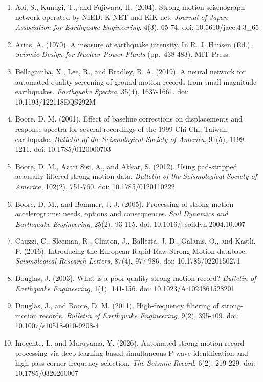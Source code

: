 \documentclass[UTF8,a4paper,zihao=5]{ctexart}
\begin{document}
\begin{enumerate}
\def\labelenumi{\arabic{enumi}.}
\item
  Aoi, S., Kunugi, T., and Fujiwara, H. (2004). Strong-motion seismograph network operated by NIED: K-NET and KiK-net. \emph{Journal of Japan Association for Earthquake Engineering}, 4(3), 65-74. doi: 10.5610/jaee.4.3\_65
\item
  Arias, A. (1970). A measure of earthquake intensity. In R. J. Hansen (Ed.), \emph{Seismic Design for Nuclear Power Plants} (pp.~438-483). MIT Press.
\item
  Bellagamba, X., Lee, R., and Bradley, B. A. (2019). A neural network for automated quality screening of ground motion records from small magnitude earthquakes. \emph{Earthquake Spectra}, 35(4), 1637-1661. doi: 10.1193/122118EQS292M
\item
  Boore, D. M. (2001). Effect of baseline corrections on displacements and response spectra for several recordings of the 1999 Chi-Chi, Taiwan, earthquake. \emph{Bulletin of the Seismological Society of America}, 91(5), 1199-1211. doi: 10.1785/0120000703
\item
  Boore, D. M., Azari Sisi, A., and Akkar, S. (2012). Using pad-stripped acausally filtered strong-motion data. \emph{Bulletin of the Seismological Society of America}, 102(2), 751-760. doi: 10.1785/0120110222
\item
  Boore, D. M., and Bommer, J. J. (2005). Processing of strong-motion accelerograms: needs, options and consequences. \emph{Soil Dynamics and Earthquake Engineering}, 25(2), 93-115. doi: 10.1016/j.soildyn.2004.10.007
\item
  Cauzzi, C., Sleeman, R., Clinton, J., Ballesta, J. D., Galanis, O., and Kastli, P. (2016). Introducing the European Rapid Raw Strong-Motion database. \emph{Seismological Research Letters}, 87(4), 977-986. doi: 10.1785/0220150271
\item
  Douglas, J. (2003). What is a poor quality strong-motion record? \emph{Bulletin of Earthquake Engineering}, 1(1), 141-156. doi: 10.1023/A:1024861528201
\item
  Douglas, J., and Boore, D. M. (2011). High-frequency filtering of strong-motion records. \emph{Bulletin of Earthquake Engineering}, 9(2), 395-409. doi: 10.1007/s10518-010-9208-4
\item
  Inocente, I., and Maruyama, Y. (2026). Automated strong-motion record processing via deep learning-based simultaneous P-wave identification and high-pass corner-frequency selection. \emph{The Seismic Record}, 6(2), 219-229. doi: 10.1785/0320260007

\end{enumerate}
\end{document}
